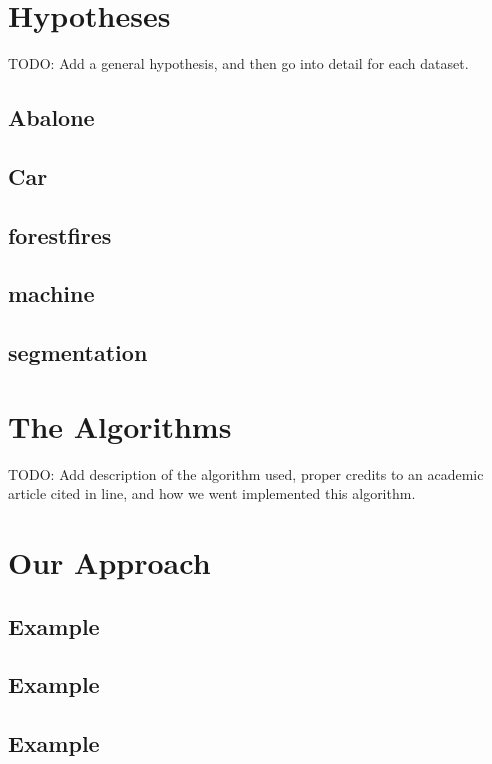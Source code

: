 \documentclass[twoside,11pt]{article}
\begin{document}
\section{Hypotheses}

TODO: Add a general hypothesis, and then go into detail for each dataset.

\subsection{Abalone}

\subsection{Car}

\subsection{forestfires}

\subsection{machine}

\subsection{segmentation}

\section{The Algorithms}
TODO: Add description of the algorithm used, proper credits to an academic article cited in line, and how we went implemented this algorithm.

\section{Our Approach}
\subsection{Example}
\subsection{Example}
\subsection{Example}

\end{document}
